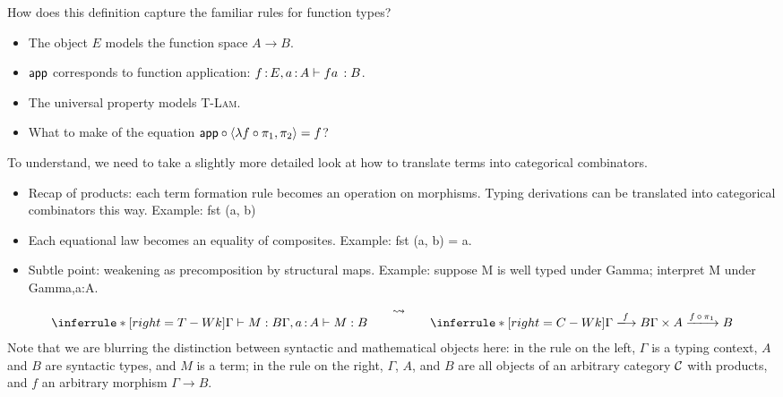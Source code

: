 \noindent How does this definition capture the familiar rules for function types?
\begin{itemize}
  \item The object \(E\) models the function space \(A \to B\).
  \item \(\mathsf{app}\) corresponds to function application:
    \(f\,{:}\, E, a\,{:}\, A \vdash fa\,: B\).
  \item The universal property models \textsc{T-Lam}.
  \item What to make of the equation \(\mathsf{app} \circ \langle \lambda f \circ \pi_1, \pi_2\rangle = f\)?
\end{itemize}

\noindent To understand, we need to take a slightly more detailed look at how to
    translate terms into categorical combinators.
\begin{itemize}
  \item Recap of products: each term formation rule becomes an operation on morphisms.
    Typing derivations can be translated into categorical combinators this way.
    Example: fst (a, b)
  \item Each equational law becomes an equality of composites.
    Example: fst (a, b) = a.
  \item Subtle point: weakening as precomposition by structural maps.
    Example: suppose M is well typed under Gamma; interpret M under Gamma,a:A.
\end{itemize}
\begin{align*}
  \inferrule*[right=T-Wk]
    {\Gamma \vdash M : B}
    {\Gamma, a\ofty A \vdash M : B}
  \qquad\raisebox{1em}{\(\leadsto\)}\qquad
  \inferrule*[right=C-Wk]
    {\Gamma \xlongrightarrow{f} B}
    {\Gamma \times A \xlongrightarrow{f\,\circ\,\pi_1} B}
\end{align*}
Note that we are blurring the distinction between syntactic and mathematical objects here:
in the rule on the left, \(\Gamma\) is a typing context, \(A\) and \(B\)
are syntactic types, and \(M\) is a term;
in the rule on the right, \(\Gamma\), \(A\), and \(B\) are all objects of an
arbitrary category \(\mathcal C\) with products,
and \(f\) an arbitrary morphism \(\Gamma \to B\).

